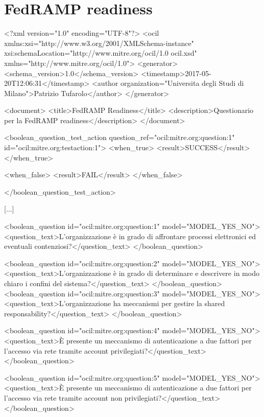 \chapter{FedRAMP readiness}
\begin{xml}
<?xml version="1.0" encoding="UTF-8"?>
<ocil xmlns:xsi="http://www.w3.org/2001/XMLSchema-instance"
  xsi:schemaLocation="http://www.mitre.org/ocil/1.0 ocil.xsd" xmlns="http://www.mitre.org/ocil/1.0">
  <generator>
    <schema_version>1.0</schema_version>
    <timestamp>2017-05-20T12:06:31</timestamp>
    <author organization="Universita degli Studi di Milano">Patrizio Tufarolo</author>
  </generator>

  <document>
    <title>FedRAMP Readiness</title>
    <description>Questionario per la FedRAMP readiness</description>
  </document>

  <boolean_question_test_action question_ref="ocil:mitre.org:question:1" id="ocil:mitre.org:testaction:1">
    <when_true>
      <result>SUCCESS</result>
    </when_true>

    <when_false>
      <result>FAIL</result>
    </when_false>

  </boolean_question_test_action>

  

  [...]



  <boolean_question id="ocil:mitre.org:question:1" model="MODEL_YES_NO">
    <question_text>L'organizzazione è in grado di affrontare processi elettronici ed eventuali contenziosi?</question_text>
  </boolean_question>

  <boolean_question id="ocil:mitre.org:question:2" model="MODEL_YES_NO">
    <question_text>L'organizzazione è in grado di determinare e descrivere in modo chiaro i confini del sistema?</question_text>
  </boolean_question>
  <boolean_question id="ocil:mitre.org:question:3" model="MODEL_YES_NO">
    <question_text>L'organizzazione ha meccanismi per gestire la shared responsability?</question_text>
  </boolean_question>

  <boolean_question id="ocil:mitre.org:question:4" model="MODEL_YES_NO">
    <question_text>È presente un meccanismo di autenticazione a due fattori per l'accesso via rete tramite account privilegiati?</question_text>
  </boolean_question>

  <boolean_question id="ocil:mitre.org:question:5" model="MODEL_YES_NO">
    <question_text>È presente un meccanismo di autenticazione a due fattori per l'accesso via rete tramite account non privilegiati?</question_text>
  </boolean_question>


\end{xml}
